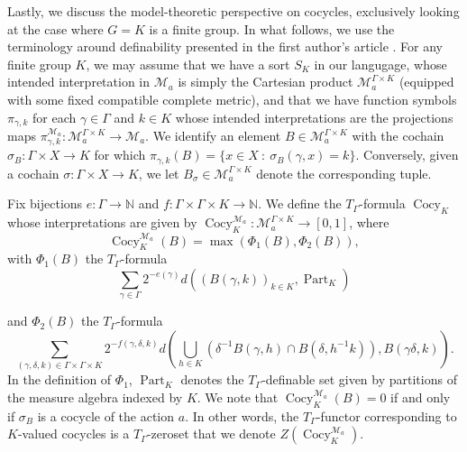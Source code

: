 \documentclass[12pt]{amsart}
\theoremstyle{definition}
\def\bb{\mathbb}
\def\bb{\mathbb}
\def\cal{\mathcal}
\def\Cocy{\operatorname{Cocy}}
\begin{document}
Lastly, we discuss the model-theoretic perspective on cocycles, exclusively looking at the case where $G = K$ is a finite group. In what follows, we use the terminology around definability presented in the first author's article \cite{spgap}.  For any finite group $K$, we may assume that we have a sort $S_K$ in our langugage, whose intended interpretation in $\cal M_a$ is simply the Cartesian product $\cal M_a^{\Gamma\times K}$ (equipped with some fixed compatible complete metric), and that we have function symbols $\pi_{\gamma,k}$ for each $\gamma\in \Gamma$ and $k\in K$ whose intended interpretations are the projections maps $\pi_{\gamma,k}^{\cal M_a}:\cal M_a^{\Gamma\times K}\to \cal M_a$.  We identify an element $B\in \cal M_a^{\Gamma\times K}$ with the cochain $\sigma_B:\Gamma\times X\to K$ for which $\pi_{\gamma,k}(B)=\{x\in X \ : \ \sigma_B(\gamma,x)=k\}$.  Conversely, given a cochain $\sigma:\Gamma\times X\to K$, we let $B_\sigma\in \cal M_a^{\Gamma\times K}$ denote the corresponding tuple.

Fix bijections $e:\Gamma\to \bb N$ and $f:\Gamma\times \Gamma\times K\to \mathbb N$.  We define the $T_\Gamma$-formula $\Cocy_K$ whose interpretations are given by $\Cocy_K^{\cal M_a}: \cal M_a^{\Gamma\times K}\to [0,1]$, where 
$$\Cocy_K^{\cal M_a}(B)=\max(\Phi_1(B),\Phi_2(B)),$$ with $\Phi_1(B)$ the $T_\Gamma$-formula
$$\sum_{\gamma\in \Gamma}2^{-e(\gamma)}d((B(\gamma,k))_{k\in K},\operatorname{Part}_K)$$

and $\Phi_2(B)$ the $T_\Gamma$-formula $$\sum_{(\gamma,\delta,k)\in \Gamma\times \Gamma\times K}2^{-f(\gamma,\delta,k)}d\left( \bigcup_{h \in K} (\delta^{-1}B(\gamma,h)\cap B(\delta,h^{-1}k)),B(\gamma\delta,k)\right).$$
In the definition of $\Phi_1$, $\operatorname{Part}_K$ denotes the $T_\Gamma$-definable set given by partitions of the measure algebra indexed by $K$.  We note that $\Cocy_K^{\cal M_a}(B)=0$ if and only if $\sigma_B$ is a cocycle of the action $a$.  In other words, the $T_\Gamma$-functor corresponding to $K$-valued cocycles is a $T_\Gamma$-zeroset that we denote $Z(\Cocy_K^{\cal M_a})$.
\end{document}
